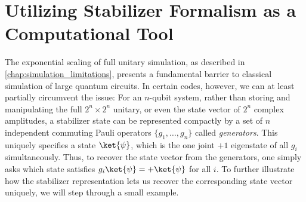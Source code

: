 \chapter{Utilizing Stabilizer Formalism as a Computational Tool}
The exponential scaling of full unitary simulation, as described in \cref{chap:simulation_limitations}, presents a fundamental barrier to classical simulation of large quantum circuits. In certain codes, however, we can at least partially circumvent the issue: For an $n$-qubit system, rather than storing and manipulating the full $2^n \times 2^n$ unitary, or even the state vector of $2^n$ complex amplitudes, a stabilizer state can be represented compactly by a set of $n$ independent commuting Pauli operators $\{g_1, \ldots, g_n\}$ called \emph{generators}. This uniquely specifies a state $\ket{\psi}$, which is the one joint $+1$ eigenstate of all $g_i$ simultaneously. Thus, to recover the state vector from the generators, one simply asks which state satisfies $g_i\ket{\psi} = +\ket{\psi}$ for all $i$. To further illustrate how the stabilizer representation lets us recover the corresponding state vector uniquely, we will step through a small example.

\begin{center}
\end{center}

